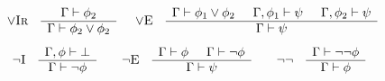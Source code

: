 \[
\begin{array}{ccc}
\begin{array}{cc}
\mbox{\sc $\vee$Ir}
&
\begin{array}{c}
 \Gamma \vdash \phi_2 \\ \hline
 \Gamma \vdash \phi_2  \vee \phi_2
\end{array}
\end{array}
&
\mbox{\sc $\vee$E}
&
\begin{array}{c}
\Gamma \vdash \phi_1 \vee \phi_2 \hspace*{0.5cm}
\Gamma, \phi_1 \vdash \psi \hspace*{0.5cm} \Gamma, \phi_2 \vdash \psi \\ \hline  
 \Gamma\vdash \psi
\end{array}
\end{array}
\]\[
\begin{array}{ccc}
\begin{array}{cc}
\mbox{\sc $\neg$I}
&
\begin{array}{c}
 \Gamma, \phi \vdash \bot \\ \hline
 \Gamma \vdash \neg\phi
\end{array}
\end{array}
&
\begin{array}{cc}
\mbox{\sc $\neg$E}
&
\begin{array}{c}
 \Gamma \vdash \phi \hspace*{0.5cm} 
 \Gamma \vdash \neg\phi \\ \hline
 \Gamma \vdash \psi
\end{array}
\end{array}
&
\begin{array}{cc}
\mbox{\sc $\neg\neg$}
&
\begin{array}{c}
 \Gamma \vdash \neg\neg\phi \\ \hline
 \Gamma \vdash \phi
\end{array}
\end{array}
\end{array}
\]


